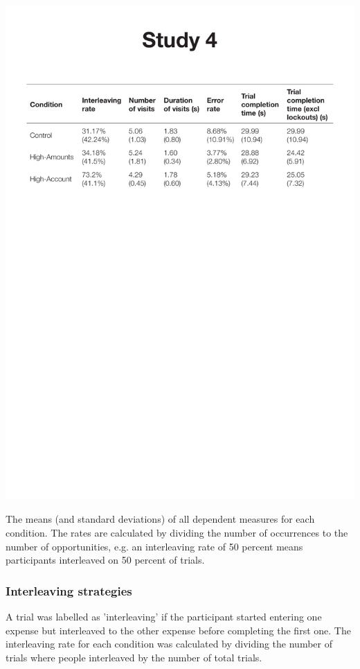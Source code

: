 \begin{table}
 \includegraphics[width=\textwidth]{images/ch34/ch34-means.pdf}
\caption{The means (and standard deviations) of all dependent measures for each condition. The rates are calculated by dividing the number of occurrences to the number of opportunities, e.g. an interleaving rate of 50 percent means participants interleaved on 50 percent of trials.}
\label{tbl:ch34_4-means}
\end{table}

\subsubsection{Interleaving strategies}
A trial was labelled as 'interleaving' if the participant started entering one expense but interleaved to the other expense before completing the first one. The interleaving rate for each condition was calculated by dividing the number of trials where people interleaved by the number of total trials. 

